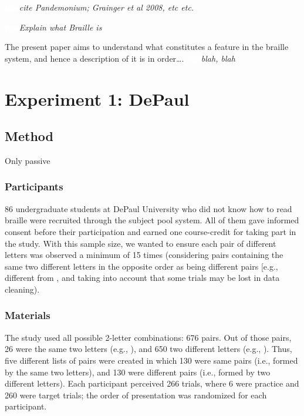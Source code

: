 \documentclass[english,man]{apa7}
\begin{document}
{\colorbox{darkyellow}{\sffamily\scriptsize\bfseries\textcolor{white}{pga}}}{\sffamily\small\itshape\textcolor{darkyellow}{cite Pandemonium; Grainger et al 2008, etc etc.}}

{\colorbox{darkyellow}{\sffamily\scriptsize\bfseries\textcolor{white}{pga}}}{\sffamily\small\itshape\textcolor{darkyellow}{Explain what Braille is}}

The present paper aims to understand what constitutes a feature in the braille system, and hence a description of it is in order\ldots{}. {\colorbox{darkyellow}{\sffamily\scriptsize\bfseries\textcolor{white}{pga}}}{\sffamily\small\itshape\textcolor{darkyellow}{blah, blah}}

\hypertarget{experiment-1-depaul}{%
\section{Experiment 1: DePaul}\label{experiment-1-depaul}}

\hypertarget{method}{%
\subsection{Method}\label{method}}

Only passive

\hypertarget{participants}{%
\subsubsection{Participants}\label{participants}}

86 undergraduate students at DePaul University who did not know how to read braille were recruited through the subject pool system. All of them gave informed consent before their participation and earned one course-credit for taking part in the study. With this sample size, we wanted to ensure each pair of different letters was observed a minimum of 15 times (considering pairs containing the same two different letters in the opposite order as being different pairs {[}e.g.,   different from  \braille{l}{]}, and taking into account that some trials may be lost in data cleaning).

\hypertarget{materials}{%
\subsubsection{Materials}\label{materials}}

The study used all possible 2-letter combinations: 676 pairs. Out of those pairs, 26 were the same two letters (e.g.,  ), and 650 two different letters (e.g.,  ). Thus, five different lists of pairs were created in which 130 were same pairs (i.e., formed by the same two letters), and 130 were different pairs (i.e., formed by two different letters). Each participant perceived 266 trials, where 6 were practice and 260 were target trials; the order of presentation was randomized for each participant.
\end{document}
